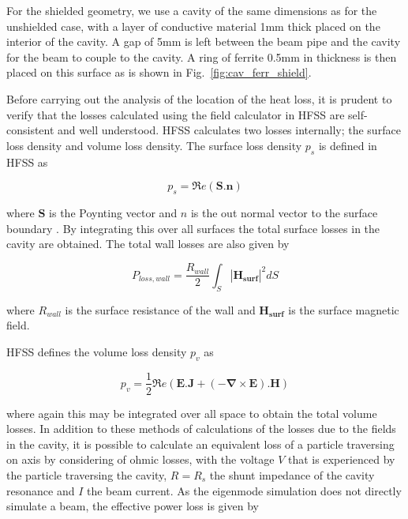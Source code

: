 For the shielded geometry, we use a cavity of the same dimensions as for the unshielded case, with a layer of conductive material 1mm thick placed on the interior of the cavity. A gap of 5mm is left between the beam pipe and the cavity for the beam to couple to the cavity. A ring of ferrite 0.5mm in thickness is then placed on this surface as is shown in Fig.~\ref{fig:cav_ferr_shield}.

Before carrying out the analysis of the location of the heat loss, it is prudent to verify that the losses calculated using the field calculator in HFSS are self-consistent and well understood. HFSS calculates two losses internally; the surface loss density and volume loss density. The surface loss density $p_{s}$ is defined in HFSS as

\begin{equation}
p_{s} = \Re{}e \left( \mathbf{S}.\mathbf{n} \right)
\end{equation}

where $\mathbf{S}$ is the Poynting vector and $n$ is the out normal vector to the surface boundary \cite{hfss}. By integrating this over all surfaces the total surface losses in the cavity are obtained. The total wall losses are also given by 

\begin{equation}
P_{loss, wall} = \frac{R_{wall}}{2} \int_{S} \left| \mathbf{H_{surf}} \right|^{2} dS
\label{eqn:wall_losses}
\end{equation}

where $R_{wall}$ is the surface resistance of the wall and $\mathbf{H_{surf}}$ is the surface magnetic field.

HFSS defines the volume loss density $p_{v}$ as 

\begin{equation}
p_{v}=\frac{1}{2}\Re{}e\left( \mathbf{E}.\mathbf{J} + \left( -\mathbf{\nabla} \times \mathbf{E} \right).\mathbf{H} \right) 
\label{eqn:vol_loss_density}
\end{equation}

where again this may be integrated over all space to obtain the total volume losses. In addition to these methods of calculations of the losses due to the fields in the cavity, it is possible to calculate an equivalent loss of a particle traversing on axis by considering of ohmic losses, with the voltage $V$ that is experienced by the particle traversing the cavity, $R = R_{s}$ the shunt impedance of the cavity resonance and $I$ the beam current. As the eigenmode simulation does not directly simulate a beam, the effective power loss is given by 

